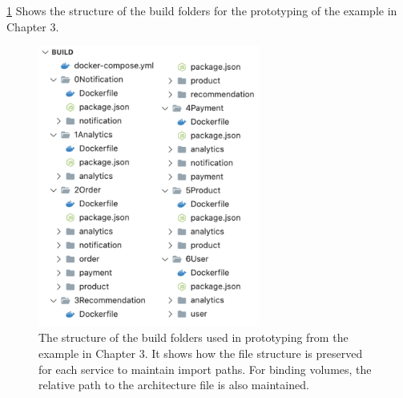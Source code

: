 \cref{figure:buildfolder_structure} Shows the structure of the build folders for the prototyping of the example in Chapter 3.  

\begin{figure}[t]
    \center
    \includegraphics[width=0.65\textwidth]{figures/bf.png}
    \caption{The structure of the build folders used in prototyping from the example in Chapter 3. It shows how the file structure is preserved for each service to maintain import paths. For binding volumes, the relative path to the architecture file is also maintained.}
    \label{figure:buildfolder_structure}
\end{figure}